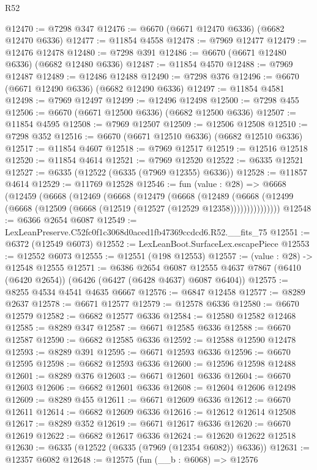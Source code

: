 \begin{lexlean}{R52}
\begin{coremodule}
@12470 := @7298 @347
@12476 := @6670 (@6671 @12470 @6336) (@6682 @12470 @6336)
@12477 := @11854 @4558
@12478 := @7969 @12477
@12479 := @12476 @12478
@12480 := @7298 @391
@12486 := @6670 (@6671 @12480 @6336) (@6682 @12480 @6336)
@12487 := @11854 @4570
@12488 := @7969 @12487
@12489 := @12486 @12488
@12490 := @7298 @376
@12496 := @6670 (@6671 @12490 @6336) (@6682 @12490 @6336)
@12497 := @11854 @4581
@12498 := @7969 @12497
@12499 := @12496 @12498
@12500 := @7298 @455
@12506 := @6670 (@6671 @12500 @6336) (@6682 @12500 @6336)
@12507 := @11854 @4595
@12508 := @7969 @12507
@12509 := @12506 @12508
@12510 := @7298 @352
@12516 := @6670 (@6671 @12510 @6336) (@6682 @12510 @6336)
@12517 := @11854 @4607
@12518 := @7969 @12517
@12519 := @12516 @12518
@12520 := @11854 @4614
@12521 := @7969 @12520
@12522 := @6335 @12521
@12527 := @6335 (@12522 (@6335 (@7969 @12355) @6336))
@12528 := @11857 @4614
@12529 := @11769 @12528
@12546 := fun (value : @28) =>
  @6668
    (@12459
      (@6668
        (@12469
          (@6668
            (@12479
              (@6668
                (@12489
                  (@6668 (@12499 (@6668 (@12509 (@6668 (@12519 (@12527 (@12529 @12358)))))))))))))))
@12548 := @6366 @2654 @6087
@12549 := LexLeanPreserve.C52fc0f1c3068d0aced1fb47369ccdcd6.R52.__fits_75
@12551 := @6372 (@12549 @6073)
@12552 := LexLeanBoot.SurfaceLex.escapePiece
@12553 := @12552 @6073
@12555 := @12551 (@198 @12553)
@12557 := (value : @28) -> @12548 @12555
@12571 := @6386
    @2654
    @6087
    @12555
    @4637
    @7867
    (@6410 (@6420 @2654))
    (@6426 (@6427 (@6428 @4637) @6087 @6404))
@12575 := @8255 @4534 @4541 @4635 @6667
@12576 := @6847 @12458
@12577 := @8289 @2637
@12578 := @6671 @12577
@12579 := @12578 @6336
@12580 := @6670 @12579
@12582 := @6682 @12577 @6336
@12584 := @12580 @12582 @12468
@12585 := @8289 @347
@12587 := @6671 @12585 @6336
@12588 := @6670 @12587
@12590 := @6682 @12585 @6336
@12592 := @12588 @12590 @12478
@12593 := @8289 @391
@12595 := @6671 @12593 @6336
@12596 := @6670 @12595
@12598 := @6682 @12593 @6336
@12600 := @12596 @12598 @12488
@12601 := @8289 @376
@12603 := @6671 @12601 @6336
@12604 := @6670 @12603
@12606 := @6682 @12601 @6336
@12608 := @12604 @12606 @12498
@12609 := @8289 @455
@12611 := @6671 @12609 @6336
@12612 := @6670 @12611
@12614 := @6682 @12609 @6336
@12616 := @12612 @12614 @12508
@12617 := @8289 @352
@12619 := @6671 @12617 @6336
@12620 := @6670 @12619
@12622 := @6682 @12617 @6336
@12624 := @12620 @12622 @12518
@12630 := @6335 (@12522 (@6335 (@7969 (@12354 @6082)) @6336))
@12631 := @12357 @6082
@12648 := @12575
    (fun (__b : @6068) =>
    @12576

\end{coremodule}
\end{lexlean}
